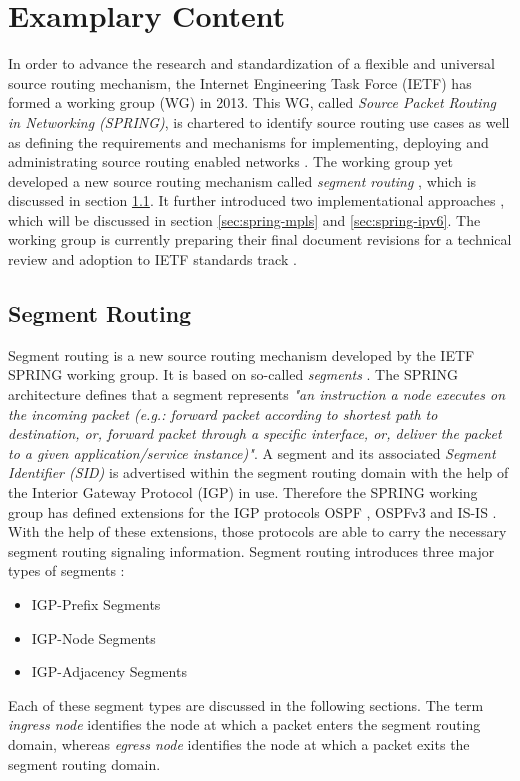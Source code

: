 \section{Examplary Content}
\label{chap:spring}
In order to advance the research and standardization of a flexible and universal source routing mechanism, the Internet Engineering Task Force (IETF) has formed a working group (WG) in 2013. This WG, called \emph{Source Packet Routing in Networking (SPRING)}, is chartered to identify source routing use cases as well as defining the requirements and mechanisms for implementing, deploying and administrating source routing enabled networks \cite{springcharter}. The working group yet developed a new source routing mechanism called \emph{segment routing} \cite{spring-sr-10}, which is discussed in section \ref{sec:spring-sr}. It further introduced two implementational approaches \cite{spring-ipv6,spring-mpls}, which will be discussed in section \ref{sec:spring-mpls} and \ref{sec:spring-ipv6}. The working group is currently preparing their final document revisions for a technical review and adoption to IETF standards track \cite{springstatus}.

\subsection{Segment Routing}
\label{sec:spring-sr}
Segment routing is a new source routing mechanism developed by the IETF SPRING working group. It is based on so-called \emph{segments} \cite{spring-sr-10}. The SPRING architecture \cite{spring-sr-10} defines that a segment represents \emph{"an instruction a node executes on the incoming packet (e.g.: forward packet according to shortest path to destination, or, forward packet through a specific interface, or, deliver the packet to a given application/service instance)"}. A segment and its associated \emph{Segment Identifier (SID)} is advertised within the segment routing domain with the help of the Interior Gateway Protocol (IGP) in use. Therefore the SPRING working group has defined extensions for the IGP protocols OSPF \cite{spring-ospf}, OSPFv3 \cite{spring-ospfv3} and IS-IS \cite{spring-isis}. With the help of these extensions, those protocols are able to carry the necessary segment routing signaling information. Segment routing introduces three major types of segments \cite{salsano2015pmsr,spring-sr-10}:
\begin{itemize}
	\item IGP-Prefix Segments
	\item IGP-Node Segments
	\item IGP-Adjacency Segments
\end{itemize}
Each of these segment types are discussed in the following sections. The term \emph{ingress node} identifies the node at which a packet enters the segment routing domain, whereas \emph{egress node} identifies the node at which a packet exits the segment routing domain.

